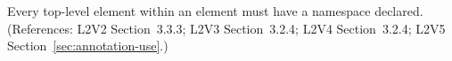 Every top-level element within an  element must have a
namespace declared.  (References: L2V2 Section~3.3.3;
L2V3 Section~3.2.4; L2V4 Section~3.2.4; L2V5 Section~\ref{sec:annotation-use}.)
